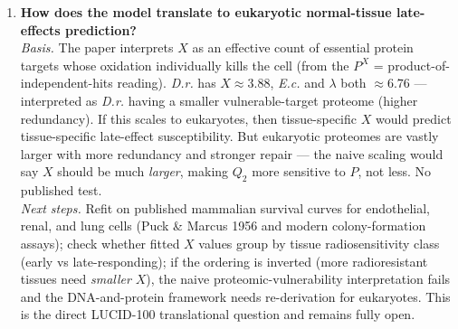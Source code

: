 \begin{enumerate}
\item \textbf{How does the model translate to eukaryotic normal-tissue late-effects prediction?}\\
\emph{Basis.} The paper interprets $X$ as an effective count of essential protein targets whose
oxidation individually kills the cell (from the $P^X$ = product-of-independent-hits reading).
\textit{D.r.} has $X \approx 3.88$, \textit{E.c.} and $\lambda$ both $\approx 6.76$ ---
interpreted as \textit{D.r.} having a smaller vulnerable-target proteome (higher redundancy).
If this scales to eukaryotes, then tissue-specific $X$ would predict tissue-specific
late-effect susceptibility. But eukaryotic proteomes are vastly larger with more redundancy and
stronger repair --- the naive scaling would say $X$ should be much \emph{larger}, making $Q_2$
more sensitive to $P$, not less. No published test.\\
\emph{Next steps.} Refit on published mammalian survival curves for endothelial, renal, and
lung cells (Puck \& Marcus 1956 and modern colony-formation assays); check whether fitted $X$
values group by tissue radiosensitivity class (early vs late-responding); if the ordering is
inverted (more radioresistant tissues need \emph{smaller} $X$), the naive proteomic-vulnerability
interpretation fails and the DNA-and-protein framework needs re-derivation for eukaryotes.
This is the direct LUCID-100 translational question and remains fully open.
\end{enumerate}
